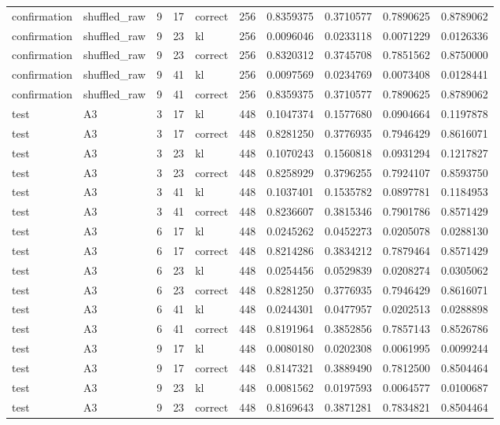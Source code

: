 \begin{tabular}{llrrlrrrrr}
confirmation & shuffled_raw & 9 & 17 & correct & 256 & 0.8359375 & 0.3710577 & 0.7890625 & 0.8789062 \\
confirmation & shuffled_raw & 9 & 23 & kl & 256 & 0.0096046 & 0.0233118 & 0.0071229 & 0.0126336 \\
confirmation & shuffled_raw & 9 & 23 & correct & 256 & 0.8320312 & 0.3745708 & 0.7851562 & 0.8750000 \\
confirmation & shuffled_raw & 9 & 41 & kl & 256 & 0.0097569 & 0.0234769 & 0.0073408 & 0.0128441 \\
confirmation & shuffled_raw & 9 & 41 & correct & 256 & 0.8359375 & 0.3710577 & 0.7890625 & 0.8789062 \\
test & A3 & 3 & 17 & kl & 448 & 0.1047374 & 0.1577680 & 0.0904664 & 0.1197878 \\
test & A3 & 3 & 17 & correct & 448 & 0.8281250 & 0.3776935 & 0.7946429 & 0.8616071 \\
test & A3 & 3 & 23 & kl & 448 & 0.1070243 & 0.1560818 & 0.0931294 & 0.1217827 \\
test & A3 & 3 & 23 & correct & 448 & 0.8258929 & 0.3796255 & 0.7924107 & 0.8593750 \\
test & A3 & 3 & 41 & kl & 448 & 0.1037401 & 0.1535782 & 0.0897781 & 0.1184953 \\
test & A3 & 3 & 41 & correct & 448 & 0.8236607 & 0.3815346 & 0.7901786 & 0.8571429 \\
test & A3 & 6 & 17 & kl & 448 & 0.0245262 & 0.0452273 & 0.0205078 & 0.0288130 \\
test & A3 & 6 & 17 & correct & 448 & 0.8214286 & 0.3834212 & 0.7879464 & 0.8571429 \\
test & A3 & 6 & 23 & kl & 448 & 0.0254456 & 0.0529839 & 0.0208274 & 0.0305062 \\
test & A3 & 6 & 23 & correct & 448 & 0.8281250 & 0.3776935 & 0.7946429 & 0.8616071 \\
test & A3 & 6 & 41 & kl & 448 & 0.0244301 & 0.0477957 & 0.0202513 & 0.0288898 \\
test & A3 & 6 & 41 & correct & 448 & 0.8191964 & 0.3852856 & 0.7857143 & 0.8526786 \\
test & A3 & 9 & 17 & kl & 448 & 0.0080180 & 0.0202308 & 0.0061995 & 0.0099244 \\
test & A3 & 9 & 17 & correct & 448 & 0.8147321 & 0.3889490 & 0.7812500 & 0.8504464 \\
test & A3 & 9 & 23 & kl & 448 & 0.0081562 & 0.0197593 & 0.0064577 & 0.0100687 \\
test & A3 & 9 & 23 & correct & 448 & 0.8169643 & 0.3871281 & 0.7834821 & 0.8504464 \\

\end{tabular}
